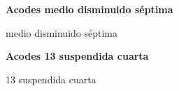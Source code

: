 \vskip 20pt
\textbf{Acodes medio disminuido s\'eptima}
\vskip 25pt

\small
{} medio disminuido s\'eptima
\normalsize

\vskip 20pt
\textbf{Acodes 13 suspendida cuarta}
\vskip 25pt

\small
{} 13 suspendida cuarta
\normalsize

\clearpage
\fi
%
